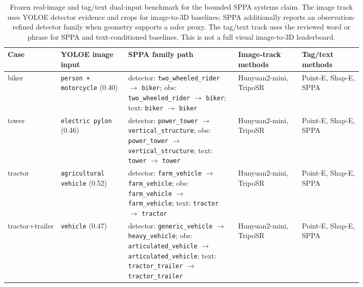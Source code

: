 \begin{table}[H]
\centering
\footnotesize
\setlength{\tabcolsep}{3pt}
\renewcommand{\arraystretch}{1.08}
\caption{Frozen real-image and tag/text dual-input benchmark for the bounded SPPA systems claim. The image track uses YOLOE detector evidence and crops for image-to-3D baselines; SPPA additionally reports an observation-refined detector family when geometry supports a safer proxy. The tag/text track uses the reviewed word or phrase for SPPA and text-conditioned baselines. This is not a full visual image-to-3D leaderboard.}
\label{tab:real-yoloe-dual-input-benchmark}
\begin{tabularx}{\linewidth}{@{}L{0.13\linewidth}L{0.19\linewidth}L{0.31\linewidth}L{0.18\linewidth}Y@{}}
\toprule
Case & YOLOE image input & SPPA family path & Image-track methods & Tag/text methods \\
\midrule
biker & \texttt{person + motorcycle} (0.40) & detector: \texttt{two\_wheeled\_rider} $\rightarrow$ \texttt{biker}; obs: \texttt{two\_wheeled\_rider} $\rightarrow$ \texttt{biker}; text: \texttt{biker} $\rightarrow$ \texttt{biker} & Hunyuan2-mini, TripoSR & Point-E, Shap-E, SPPA \\
tower & \texttt{electric pylon} (0.46) & detector: \texttt{power\_tower} $\rightarrow$ \texttt{vertical\_structure}; obs: \texttt{power\_tower} $\rightarrow$ \texttt{vertical\_structure}; text: \texttt{tower} $\rightarrow$ \texttt{tower} & Hunyuan2-mini, TripoSR & Point-E, Shap-E, SPPA \\
tractor & \texttt{agricultural vehicle} (0.52) & detector: \texttt{farm\_vehicle} $\rightarrow$ \texttt{farm\_vehicle}; obs: \texttt{farm\_vehicle} $\rightarrow$ \texttt{farm\_vehicle}; text: \texttt{tractor} $\rightarrow$ \texttt{tractor} & Hunyuan2-mini, TripoSR & Point-E, Shap-E, SPPA \\
tractor+trailer & \texttt{vehicle} (0.47) & detector: \texttt{generic\_vehicle} $\rightarrow$ \texttt{heavy\_vehicle}; obs: \texttt{articulated\_vehicle} $\rightarrow$ \texttt{articulated\_vehicle}; text: \texttt{tractor\_trailer} $\rightarrow$ \texttt{tractor\_trailer} & Hunyuan2-mini, TripoSR & Point-E, Shap-E, SPPA \\
\bottomrule
\end{tabularx}
\end{table}
